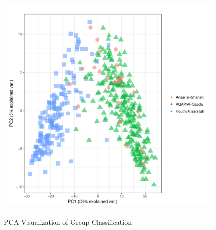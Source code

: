 \begin{figure}
\begin{center}
\begin{tabular}{c}
 \includegraphics[width=5.00in]{./Pictures/pca_proximityRF.pdf}
\end{tabular}
\caption{PCA Visualization of Group Classification}
\label{fig:rf-pca}
\end{center}
 \end{figure}


